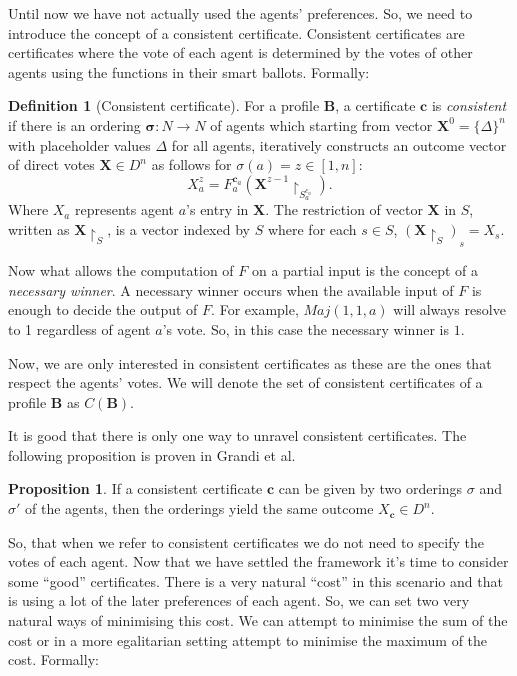 \documentclass[11pt,a4paper, titlepage]{article}
\theoremstyle{definition}
\newtheorem{definition}[theorem]{Definition}
\newtheorem{proposition}[theorem]{Proposition}
\let\vec\mathbf
\begin{document}
Until now we have not actually used the agents' preferences. So, we need to introduce the concept of a consistent certificate. Consistent certificates are certificates where the vote of each agent is determined by the votes of other agents using the functions in their smart ballots. Formally:

\begin{definition}[Consistent certificate]
    For a profile $\mathbf{B}$, a certificate $\mathbf{c}$ is \emph{consistent} if there is an ordering $\mathbf{\sigma} \colon N \longrightarrow N$ of agents which starting from vector $\vec{X}^0 = \{\Delta\}^n$ with placeholder values $\Delta$ for all agents, iteratively constructs an outcome vector of direct votes $\vec{X} \in D^n$ as follows for $\sigma(a) = z \in [1,n]$:
    \[
        X^z_a = F^{\mathbf{c}_a}_a(\vec{X}^{z-1} \restriction_{S^{c_a}_a} ).
    \]
    Where $X_a$ represents agent $a$'s entry in $\vec{X}$. The restriction of vector $\vec{X}$ in $S$, written as $\vec{X} \restriction_S$, is a vector indexed by $S$ where for each $s \in S$,  $(\vec{X} \restriction_S)_s = X_s$.

\end{definition}
Now what allows the computation of $F$ on a partial input is the concept of a \emph{necessary winner}. A necessary winner occurs when the available input of $F$ is enough to decide  the output of $F$. For example, $\mathit{Maj}(1, 1, a)$ will always resolve to 1 regardless of agent $a$'s vote. So, in this case the necessary winner is $1$.

Now, we are only interested in consistent certificates as these are the ones that respect the agents' votes. We will denote the set of consistent certificates of a profile $\mathbf{B}$ as $C(\mathbf{B})$.

It is good that there is only one way to unravel consistent certificates. The following proposition is proven in Grandi et al.

\begin{proposition}
    If a consistent certificate $\mathbf{c}$ can be given by two orderings $\sigma$ and $\sigma'$ of the agents, then the orderings yield the same outcome $X_\mathbf{c} \in D^n$.
\end{proposition}

So, that when we refer to consistent certificates we do not need to specify the votes of each agent. Now that we have settled the framework it's time to consider some ``good'' certificates. There is a very natural ``cost'' in this scenario and that is using a lot of the later preferences of each agent. So, we can set two very natural ways of minimising this cost. We can attempt to minimise the sum of the cost or in a more egalitarian setting attempt to minimise the maximum of the cost. Formally:
\end{document}
